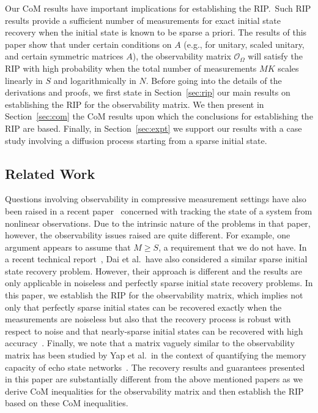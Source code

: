 \documentclass[11pt,draftcls,onecolumn]{IEEEtran}
\def \ok {{\mathcal{O}_{\Omega}}}
\newcommand{\cut}[1]{}
\begin{document}
Our \ac{CoM} results have important implications for establishing the \ac{RIP}.~Such \ac{RIP} results provide a sufficient number of measurements for exact initial state recovery when the initial state is known to be sparse a priori. The results of this paper show that under certain conditions on $A$
(e.g., for unitary, scaled unitary, and certain symmetric matrices $A$), the observability matrix $\ok$ will satisfy the
\ac{RIP} with high probability when the total number of
measurements $MK$ scales linearly in $S$ and logarithmically in $N$.
Before going into the details of the derivations and proofs, we first state in Section~\ref{sec:rip} our main results on establishing the \ac{RIP} for the observability matrix.
We then present in Section~\ref{sec:com} the \ac{CoM} results upon which the conclusions for establishing the RIP are based.
Finally, in Section~\ref{sec:expt} we support our results with a case study involving a diffusion process starting from a sparse initial state.
\cut{As an example, one could imagine a situation where a few drops of poison have been introduced into particular (i.e., sparse) locations in a lake of water. From the available measurements at later times, we would like to estimate the source of the contamination.
}


\subsection{Related Work}

Questions involving observability in compressive measurement settings have also been raised in a recent paper~\cite{wangCPF} concerned with tracking the state of a system from nonlinear observations.
Due to the intrinsic nature of the problems in that paper, however, the observability issues raised are quite different.
For example, one argument appears to assume that $M \ge S$, a requirement that we do not have.
In a recent technical report~\cite{dai2012observability}, Dai et al.\ have also considered a similar sparse initial state recovery problem. However, their approach is different and the results are only applicable in noiseless and perfectly sparse initial state recovery problems. In this paper, we establish the \ac{RIP} for the observability matrix, which implies not only that perfectly sparse initial states can be recovered exactly when the measurements are noiseless but also that the recovery process is robust with respect to noise and that nearly-sparse initial states can be recovered with high accuracy~\cite{CandesRIP}.
Finally, we note that a matrix vaguely similar to the observability matrix has been studied by Yap et al.\ in the context of quantifying the memory capacity of echo state networks~\cite{yap2012echo}.
The recovery results and guarantees presented in this paper are substantially different from the above mentioned papers as we derive \ac{CoM} inequalities for the observability matrix and then establish the \ac{RIP} based on these \ac{CoM} inequalities. 
\cut{Moreover, our results guarantee are stable recovery (recovery in presence of noise and for compressible (not perfectly sparse) initial states). 
}
\end{document}

